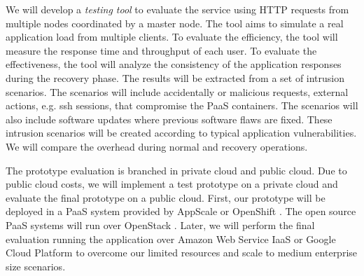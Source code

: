 We will develop a \emph{testing tool} to evaluate the service using HTTP requests from multiple nodes coordinated by a master node. The tool aims to simulate a real application load from multiple clients. To evaluate the efficiency, the tool will measure the response time and throughput of each user. To evaluate the effectiveness, the tool will analyze the consistency of the application responses during the recovery phase. The results will be extracted from a set of intrusion scenarios. The scenarios will include accidentally or malicious requests, external actions, e.g. ssh sessions, that compromise the PaaS containers. The scenarios will also include software updates where previous software flaws are fixed. These intrusion scenarios will be created according to typical application vulnerabilities. We will compare the overhead during normal and recovery operations. 

The prototype evaluation is branched in private cloud and public cloud. Due to public cloud costs, we will implement a test prototype on a private cloud and evaluate the final prototype on a public cloud. First, our prototype will be deployed in a PaaS system provided by AppScale \cite{Appscale} or OpenShift \cite{OpenShift}. The open source PaaS systems will run over OpenStack \cite{openstack}. Later, we will perform the final evaluation running the application over Amazon Web Service IaaS \cite{aws} or Google Cloud Platform \cite{googleCloudPlatform} to overcome our limited resources and scale to medium enterprise size scenarios.
